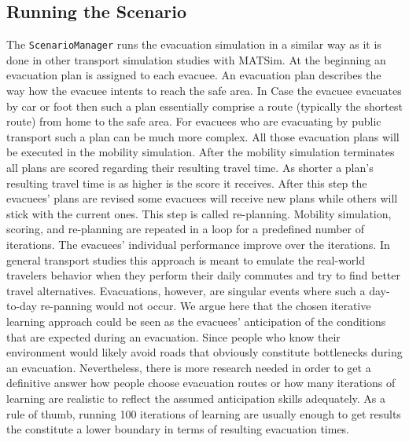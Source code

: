 \subsection{Running the Scenario}
The \verb+ScenarioManager+ runs the evacuation simulation in a similar way as it is done in other transport simulation studies with MATSim. 
At the beginning an evacuation plan is assigned to each evacuee. 
An evacuation plan describes the way how the evacuee intents to reach the safe area.
In Case the evacuee evacuates by car or foot then such a plan essentially comprise a route (typically the shortest route) from home to the safe area. For evacuees who are evacuating by public transport such a plan can be much more complex. All those evacuation plans will be executed in the mobility simulation. After the mobility simulation terminates all plans are scored regarding their resulting travel time. 
As shorter a plan's resulting travel time is as higher is the score it receives. After this step the evacuees' plans are revised some evacuees will receive new plans while others will stick with the current ones. This step is called re-planning. Mobility simulation, scoring, and re-planning are repeated in a loop for a predefined number of iterations. The evacuees' individual performance improve over the iterations. 
In general transport studies this approach is meant to emulate the real-world travelers behavior when they perform their daily commutes and try to find better travel alternatives. Evacuations, however, are singular events where such a day-to-day re-panning would not occur. We argue here that the chosen iterative learning approach could be seen as the evacuees' anticipation of the conditions that are expected during an evacuation. 
Since people who know their  environment would likely avoid roads that obviously constitute bottlenecks during an evacuation. Nevertheless, there is more research needed in order to get a definitive answer how people choose evacuation routes or how many iterations of learning are realistic to reflect the assumed anticipation skills adequately. As a rule of thumb, running 100 iterations of learning are usually enough to get results the constitute a lower boundary in terms of resulting evacuation times.

